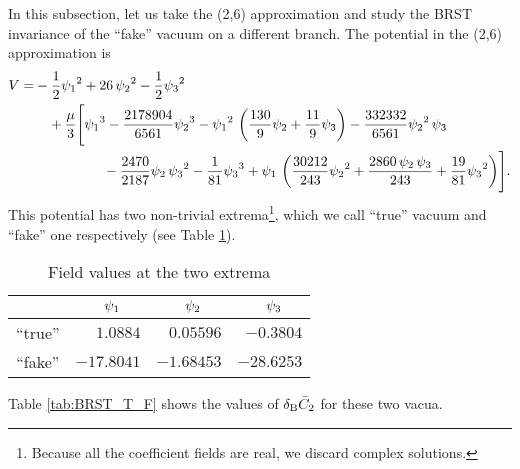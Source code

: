 \documentclass[a4paper,12pt]{article}
\begin{document}
In this subsection, let us take the (2,6) approximation and
study the BRST invariance of the ``fake'' vacuum on a different
branch.
The potential in the (2,6) approximation is
\begin{align}
V = & -\frac{1}{2}{\psi_1}^2 + 26\,{\psi_2}^2
      - \frac{1}{2}{\psi_3}^2\nonumber\\
     & \quad  +
    \frac{\mu}{3}\Biggl[ {\psi_1}^3 -
     \frac{2178904}{6561}{\psi_2}^3
     - {\psi_1}^2\,
      \left( \frac{130}{9}\psi_2
        + \frac{11}{9}\psi_3 \right)
     - \frac{332332}{6561}{\psi_2}^2\,\psi_3\\
     & \hspace*{5em}  - \frac{2470}{2187}\psi_2\,{\psi_3}^2
     - \frac{1}{81}{\psi_3}^3
     + \psi_1\,\left( \frac{30212}{243}{\psi_2}^2
                  + \frac{2860\,\psi_2\,\psi_3}{243}
                  + \frac{19}{81}{\psi_3}^2 \right)
     \Biggr] . \nonumber
\end{align}
This potential has two non-trivial extrema\footnote{
Because all the coefficient fields
  are real, we discard complex solutions.},
which we call ``true'' vacuum  and ``fake'' one respectively
(see Table \ref{tab:T_F}).
\begin{table}[hbt]
  \begin{center}
    \leavevmode
    \begin{tabular}{c||r|r|r}\hline
       &  $\psi_1\ph{aai}$ & $\psi_2\ph{aai}$
        & $\psi_3\ph{aai}$ \\ \hline
     ``true'' &  $1.0884$  &  $0.05596$ &  $-0.3804$ \\
     ``fake'' & $-17.8041$ & $-1.68453$ & $-28.6253$ \\ \hline
    \end{tabular}
    \caption{Field values at the two extrema}
    \label{tab:T_F}
  \end{center}
\end{table}
Table \ref{tab:BRST_T_F} shows the values of $\delta_{\text B}\bar C_2$ for these
two vacua.
\end{document}

